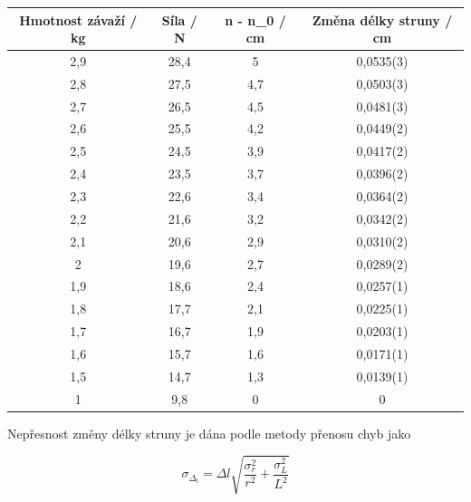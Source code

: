 \begin{table}[h]
\centering
\begin{tabular}{|c|c|c|c|}
\hline
Hmotnost závaží / kg & Síla / N & n - n\_0 / cm & Změna délky struny / cm \\ \hline
2,9                  & 28,4     & 5             & 0,0535(3)                  \\ \hline
2,8                  & 27,5     & 4,7           & 0,0503(3)                  \\ \hline
2,7                  & 26,5     & 4,5           & 0,0481(3)                  \\ \hline
2,6                  & 25,5     & 4,2           & 0,0449(2)                  \\ \hline
2,5                  & 24,5     & 3,9           & 0,0417(2)                  \\ \hline
2,4                  & 23,5     & 3,7           & 0,0396(2)                  \\ \hline
2,3                  & 22,6     & 3,4           & 0,0364(2)                  \\ \hline
2,2                  & 21,6     & 3,2           & 0,0342(2)                  \\ \hline
2,1                  & 20,6     & 2,9           & 0,0310(2)                  \\ \hline
2                    & 19,6     & 2,7           & 0,0289(2)                  \\ \hline
1,9                  & 18,6     & 2,4           & 0,0257(1)                  \\ \hline
1,8                  & 17,7     & 2,1           & 0,0225(1)                  \\ \hline
1,7                  & 16,7     & 1,9           & 0,0203(1)                  \\ \hline
1,6                  & 15,7     & 1,6           & 0,0171(1)                  \\ \hline
1,5                  & 14,7     & 1,3           & 0,0139(1)                  \\ \hline
1                    & 9,8      & 0             & 0                  \\ \hline
\end{tabular}
\end{table}

\newpage

Nepřesnost změny délky struny je dána podle metody přenosu chyb jako

\begin{equation}
    \sigma_\Delta_l = \Delta l \sqrt{\frac{\sigma^2_r}{r^2}+\frac{\sigma^2_L}{L^2}}
\end{equation}

